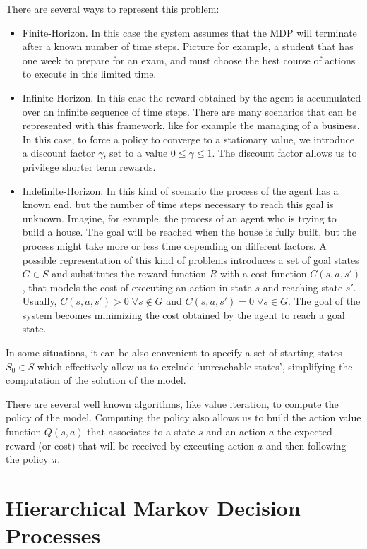 There are several ways to represent this problem:
\begin{itemize}
\item Finite-Horizon. In this case the system assumes that the MDP will terminate after a known number of time steps. Picture for example, a student that has one week to prepare for an exam, and must choose the best course of actions to execute in this limited time.
\item Infinite-Horizon. In this case the reward obtained by the agent is accumulated over an infinite sequence of time steps. There are many scenarios that can be represented with this framework, like for example the managing of a business. In this case, to force a policy to converge to a stationary value, we introduce a discount factor $\gamma$, set to a value $0 \leq \gamma \leq 1$. The discount factor allows us to privilege shorter term rewards.
\item Indefinite-Horizon. In this kind of scenario the process of the agent has a known end, but the number of time steps necessary to reach this goal is unknown. Imagine, for example, the process of an agent who is trying to build a house. The goal will be reached when the house is fully built, but the process might take more or less time depending on different factors.  A possible representation of this kind of problems introduces a set of goal states $G \in S$ and substitutes the reward function $R$ with a cost function $C(s,a,s')$, that models the cost of executing an action in state $s$ and reaching state $s'$. Usually, $C(s,a,s')>0\; \forall s \not \in G$ and $C(s,a,s')=0\; \forall s \in G$. The goal of the system becomes minimizing the cost obtained by the agent to reach a goal state.
\end{itemize}

In some situations, it can be also convenient to specify a set of starting states $S_0 \in S$ which effectively allow us to exclude `unreachable states', simplifying the computation of the solution of the model.

There are several well known algorithms, like value iteration, to compute the policy of the model. Computing the policy also allows us to build the action value function \(Q(s,a)\) that associates to a state $s$ and an action $a$ the expected reward (or cost) that will be received by executing action $a$ and then following the policy $\pi$. 

\section{Hierarchical Markov Decision Processes}
\label{sec:methods-hmdp}

